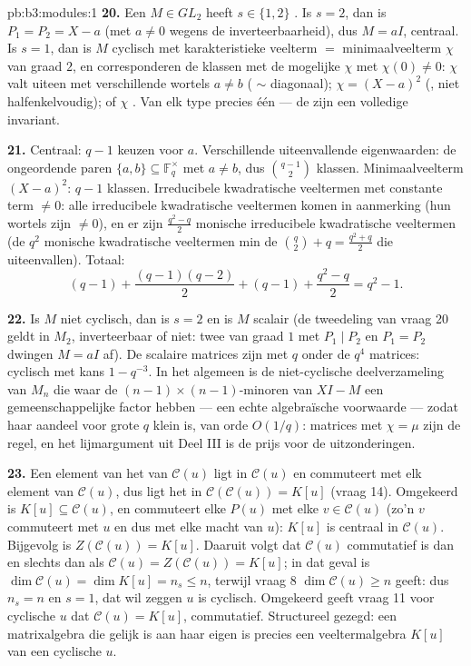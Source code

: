 \begin{solution}{pb:b3:modules:1}
\textbf{20.} Een $M \in GL_2$ heeft $s \in \{1, 2\}$ . Is $s = 2$, dan is $P_1 = P_2 = X - a$ (met $a \neq 0$
wegens de inverteerbaarheid), dus $M = aI$, centraal. Is $s = 1$,
dan is $M$ cyclisch met karakteristieke veelterm $=$
minimaalveelterm $\chi$ van graad $2$, en corresponderen de
klassen met de mogelijke $\chi$ met $\chi(0) \neq 0$: $\chi$ valt
uiteen met verschillende wortels $a \neq b$ (
$\sim$ diagonaal); $\chi = (X - a)^2$ (, niet
halfenkelvoudig); of $\chi$ . Van elk type precies één
--- de  zijn een volledige invariant.

\textbf{21.} Centraal: $q - 1$ keuzen voor $a$. Verschillende
uiteenvallende eigenwaarden: de ongeordende paren $\{a, b\}
\subseteq \mathbb F_q^\times$ met $a \neq b$, dus $\binom{q-1}2$
klassen. Minimaalveelterm $(X-a)^2$: $q - 1$ klassen. Irreducibele
kwadratische veeltermen met constante term $\neq 0$: alle
irreducibele kwadratische veeltermen komen in aanmerking (hun
wortels zijn $\neq 0$), en er zijn $\frac{q^2 - q}2$ monische
irreducibele kwadratische veeltermen (de $q^2$ monische
kwadratische veeltermen min de $\binom q2 + q = \frac{q^2+q}2$ die
uiteenvallen). Totaal:
\[
(q - 1) + \frac{(q-1)(q-2)}2 + (q - 1) + \frac{q^2 - q}2
= q^2 - 1 .
\]

\textbf{22.} Is $M$ niet cyclisch, dan is $s = 2$ en is $M$
scalair (de tweedeling van vraag 20 geldt in $M_2$, inverteerbaar
of niet: twee  van graad $1$ met $P_1 \mid P_2$
en $P_1 = P_2$ dwingen $M = aI$ af). De scalaire matrices zijn met
$q$ onder de $q^4$ matrices: cyclisch met kans $1 - q^{-3}$. In
het algemeen is de niet-cyclische deelverzameling van $M_n$ die
waar de $(n-1)\times(n-1)$-minoren van $XI - M$ een
gemeenschappelijke factor hebben --- een echte algebraïsche
voorwaarde --- zodat haar aandeel voor grote $q$ klein is, van
orde $O(1/q)$: matrices met $\chi = \mu$ zijn de regel, en het
lijmargument uit Deel III is de prijs voor de uitzonderingen.

\textbf{23.} Een element van het  van $\mathcal C(u)$ ligt
in $\mathcal C(u)$ en commuteert met elk element van $\mathcal
C(u)$, dus ligt het in $\mathcal C(\mathcal C(u)) = K[u]$ (vraag
14). Omgekeerd is $K[u] \subseteq \mathcal C(u)$, en commuteert
elke $P(u)$ met elke $v \in \mathcal C(u)$ (zo'n $v$ commuteert
met $u$ en dus met elke macht van $u$): $K[u]$ is centraal in
$\mathcal C(u)$. Bijgevolg is $Z(\mathcal C(u)) = K[u]$. Daaruit
volgt dat $\mathcal C(u)$ commutatief is dan en slechts dan als
$\mathcal C(u) = Z(\mathcal C(u)) = K[u]$; in dat geval is
$\dim\mathcal C(u) = \dim K[u] = n_s \leq n$, terwijl vraag 8
$\dim\mathcal C(u) \geq n$ geeft: dus $n_s = n$ en $s = 1$, dat
wil zeggen $u$ is cyclisch. Omgekeerd geeft vraag 11 voor
cyclische $u$ dat $\mathcal C(u) = K[u]$, commutatief.
Structureel gezegd: een matrixalgebra die gelijk is aan haar eigen
 is precies een veeltermalgebra $K[u]$ van een cyclische
$u$.


\end{solution}
